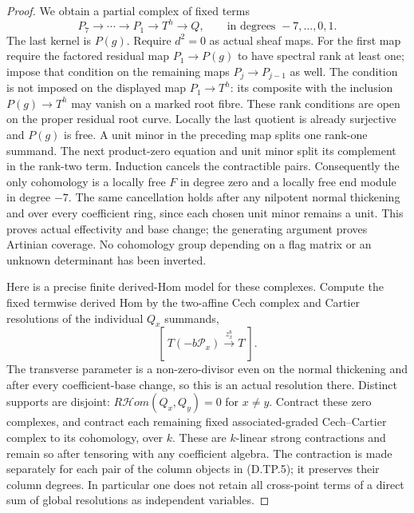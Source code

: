 \begin{proof}
We obtain a partial complex of fixed terms
\[
 P_7\longrightarrow\cdots\longrightarrow P_1
            \longrightarrow T^h\longrightarrow Q,
 \qquad\text{in degrees }-7,\ldots,0,1.             \tag{D.TP.5}
\]
The last kernel is $P(g)$. Require $d^2=0$
as actual sheaf maps. For the first map
require the factored residual map
$P_1\to P(g)$ to have spectral rank at
least one; impose that condition on the
remaining maps $P_j\to P_{j-1}$ as well.
The condition is not imposed on the
displayed map $P_1\to T^h$: its composite
with the inclusion $P(g)\to T^h$ may
vanish on a marked root fibre. These rank
conditions are open on the proper residual
root curve. Locally the last quotient is
already surjective and $P(g)$ is free.
A unit minor in the preceding map splits
one rank-one summand. The next product-zero
equation and unit minor split its complement
in the rank-two term. Induction cancels the
contractible pairs. Consequently the only
cohomology is a locally free $F$ in degree
zero and a locally free end module in degree
$-7$. The same cancellation holds after any
nilpotent normal thickening and over every
coefficient ring, since each chosen unit
minor remains a unit. This proves actual
effectivity and base change; the generating
argument proves Artinian coverage. No
cohomology group depending on a flag matrix
or an unknown determinant has been inverted.

Here is a precise finite derived-Hom model for
these complexes. Compute the fixed termwise derived
Hom by the two-affine Cech complex and Cartier
resolutions of the individual $Q_x$ summands,
\[
       [\ T(-b\mathcal P_x)\xrightarrow{z_x^b}T\ ].
                                                        \tag{D.TP.6}
\]
The transverse parameter is a non-zero-divisor
even on the normal thickening and after every
coefficient-base change, so this is an actual
resolution there. Distinct supports are disjoint:
$R\mathcal Hom(Q_x,Q_y)=0$ for $x\ne y$.
Contract these zero complexes, and contract each
remaining fixed associated-graded Cech--Cartier
complex to its cohomology, over $k$. These are
$k$-linear strong contractions and remain so after
tensoring with any coefficient algebra.
The contraction is made separately for each pair
of the column objects in (D.TP.5); it preserves
their column degrees. In particular one does not
retain all cross-point terms of a direct sum of
global resolutions as independent variables.


\end{proof}
